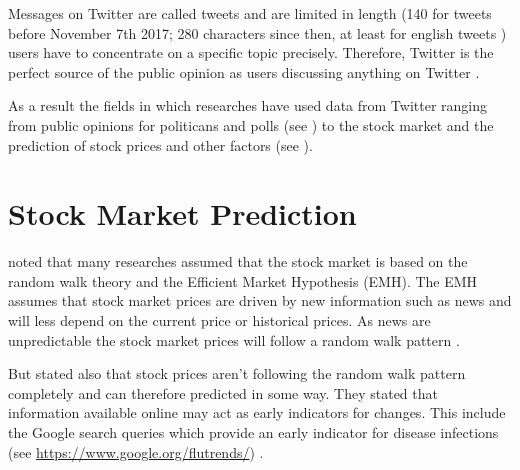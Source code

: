 Messages on Twitter are called tweets and are limited in length (140 for tweets before November 7th 2017; 280 characters since then, at least for english tweets \cite{Rosen2017TweetingEasier}) users have to concentrate on a specific topic precisely.
Therefore, Twitter is the perfect source of the public opinion as users discussing anything on Twitter \cite{Pagolu2016a}.

As a result the fields in which researches have used data from Twitter ranging from public opinions for politicans and polls (see \cite{Oconnor2010a,Patodkar2016a}) to the stock market and the prediction of stock prices and other factors (see \cite{Bollen2011a,Mittal2012a,Nguyen2015a,Pagolu2016a,Zhang2011a}).


\section{Stock Market Prediction} 
\label{s:background-stockmarketprediction}

\citeauthor{Bollen2011a} noted that many researches assumed that the stock market is based on the random walk theory and the Efficient Market Hypothesis (EMH).
The EMH assumes that stock market prices are driven by new information such as news and will less depend on the current price or historical prices.
As news are unpredictable the stock market prices will follow a random walk pattern \cite{Bollen2011a}.

But \citeauthor{Bollen2011a} stated also that stock prices aren't following the random walk pattern completely and can therefore predicted in some way.
They stated that information available online may act as early indicators for changes.
This include the Google search queries which provide an early indicator for disease infections (see \url{https://www.google.org/flutrends/}) \cite{Bollen2011a}.
